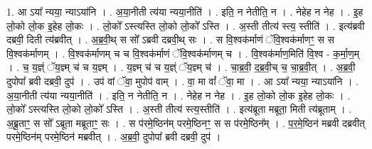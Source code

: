 \documentclass[17pt]{extarticle}
\begin{document}
1. आ ऽया᳚ न्यया॒ न्याऽया॑नि । . अ॒या॒नीती त्य॑या न्यया॒नीति॑ । . इति॒ न नेतीति॒ न । . नेहेह न नेह । . इ॒ह लो॒को लो॒क इ॒हेह लो॒कः । . लो॒को᳚ ऽस्त्यस्ति लो॒को लो॒को᳚ ऽस्ति । . अ॒स्ती तीत्य॑ स्त्य॒ स्तीति॑ । . इत्य॑ब्रवी दब्रवी॒ दिती त्य॑ब्रवीत् । . अ॒ब्र॒वी॒थ् स सो᳚ ऽब्रवी दब्रवी॒थ् सः । . स वि॒श्वक॑र्माणं ॅवि॒श्वक॑र्माणꣳ॒॒ स स वि॒श्वक॑र्माणम् । . वि॒श्वक॑र्माणम् च च वि॒श्वक॑र्माणं ॅवि॒श्वक॑र्माणम् च । . वि॒श्वक॑र्माण॒मिति॑ वि॒श्व - क॒र्मा॒ण॒म् । . च॒ य॒ज्ञ्ं ॅय॒ज्ञ्म् च॑ च य॒ज्ञ्म् । . य॒ज्ञ्म् च॑ च य॒ज्ञ्ं ॅय॒ज्ञ्म् च॑ । . चा॒ब्र॒वी॒ द॒ब्र॒वी॒च् च॒ चा॒ब्र॒वी॒त् । . अ॒ब्र॒वी॒ दुपोपा᳚ ब्रवी दब्रवी॒ दुप॑ । . उप॑ वां ॅवा॒ मुपोप॑ वाम् । . वा॒ मा वां᳚ ॅवा॒ मा । . आ ऽया᳚ न्यया॒ न्याऽया॑नि । . अ॒या॒नीती त्य॑या न्यया॒नीति॑ । . इति॒ न नेतीति॒ न । . नेहेह न नेह । . इ॒ह लो॒को लो॒क इ॒हेह लो॒कः । . लो॒को᳚ ऽस्त्यस्ति लो॒को लो॒को᳚ ऽस्ति । . अ॒स्ती तीत्य॑ स्त्य॒स्तीति॑ । . इत्य॑ब्रूता मब्रूता॒ मिती त्य॑ब्रूताम् । . अ॒ब्रू॒ताꣳ॒॒ स सो᳚ ऽब्रूता मब्रूताꣳ॒॒ सः । . स प॑रमे॒ष्ठिन॑म् परमे॒ष्ठिनꣳ॒॒ स स प॑रमे॒ष्ठिन᳚म् । . प॒र॒मे॒ष्ठिन॑ मब्रवी दब्रवीत् परमे॒ष्ठिन॑म् परमे॒ष्ठिन॑ मब्रवीत् । . अ॒ब्र॒वी॒ दुपोपा᳚ ब्रवी दब्रवी॒ दुप॑ । \newline
\end{document}
